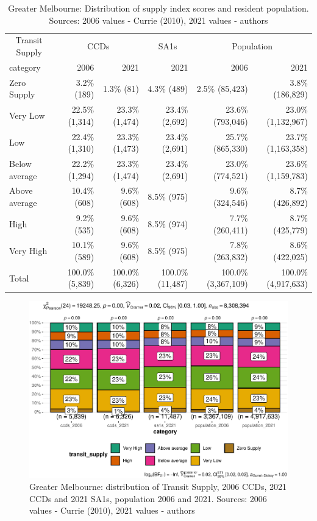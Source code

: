 \documentclass[preprint, 3p,
authoryear]{elsarticle} %
\begin{document}
\begin{table}

\caption{\label{tab:Greater_Melbourne_SA1_2021_table}Greater Melbourne: Distribution of supply index scores and resident population. Sources: 2006 values - Currie (2010), 2021 values - authors}
\centering
\begin{tabular}[t]{l|r|r|r|r|r}
\hline
\multicolumn{1}{c|}{Transit Supply} & \multicolumn{2}{c|}{CCDs} & \multicolumn{1}{c|}{SA1s} & \multicolumn{2}{c}{Population} \\
\cline{1-1} \cline{2-3} \cline{4-4} \cline{5-6}
category & 2006 & 2021 & 2021 & 2006 & 2021\\
\hline
Zero Supply & 3.2\%   (189) & 1.3\%    (81) & 4.3\%    (489) & 2.5\%    (85,423) & 3.8\%   (186,829)\\
\hline
Very Low & 22.5\% (1,314) & 23.3\% (1,474) & 23.4\%  (2,692) & 23.6\%   (793,046) & 23.0\% (1,132,967)\\
\hline
Low & 22.4\% (1,310) & 23.3\% (1,473) & 23.4\%  (2,691) & 25.7\%   (865,330) & 23.7\% (1,163,358)\\
\hline
Below average & 22.2\% (1,294) & 23.3\% (1,474) & 23.4\%  (2,691) & 23.0\%   (774,521) & 23.6\% (1,159,783)\\
\hline
Above average & 10.4\%   (608) & 9.6\%   (608) & 8.5\%    (975) & 9.6\%   (324,546) & 8.7\%   (426,892)\\
\hline
High & 9.2\%   (535) & 9.6\%   (608) & 8.5\%    (974) & 7.7\%   (260,411) & 8.7\%   (425,779)\\
\hline
Very High & 10.1\%   (589) & 9.6\%   (608) & 8.5\%    (975) & 7.8\%   (263,832) & 8.6\%   (422,025)\\
\hline
Total & 100.0\% (5,839) & 100.0\% (6,326) & 100.0\% (11,487) & 100.0\% (3,367,109) & 100.0\% (4,917,633)\\
\hline
\end{tabular}
\end{table}

\begin{figure}
\centering
\includegraphics{Leveraging_GTFS_to_assess_transit_supply_Transport_Geography_files/figure-latex/Greater_Melbourne_SA1_2021_table-1.pdf}
\caption{Greater Melbourne: distribution of Transit Supply, 2006 CCDs,
2021 CCDs and 2021 SA1s, population 2006 and 2021. Sources: 2006 values
- Currie (2010), 2021 values - authors}
\end{figure}
\end{document}
